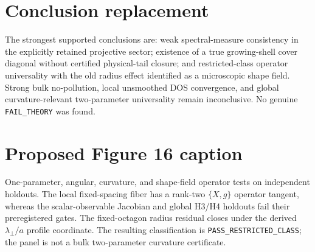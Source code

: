 \documentclass[11pt]{article}
\begin{document}
\section*{Conclusion replacement}
The strongest supported conclusions are: weak spectral-measure consistency in
the explicitly retained projective sector; existence of a true growing-shell
cover diagonal without certified physical-tail closure; and restricted-class
operator universality with the old radius effect identified as a microscopic
shape field.  Strong bulk no-pollution, local unsmoothed DOS convergence, and
global curvature-relevant two-parameter universality remain inconclusive.  No
genuine \texttt{FAIL\_THEORY} was found.

\section*{Proposed Figure 16 caption}
One-parameter, angular, curvature, and shape-field operator tests on independent
holdouts.  The local fixed-spacing fiber has a rank-two $\{X,g\}$ operator
tangent, whereas the scalar-observable Jacobian and global H3/H4 holdouts fail
their preregistered gates.  The fixed-octagon radius residual closes under the
derived $\lambda_\perp/a$ profile coordinate.  The resulting classification is
\texttt{PASS\_RESTRICTED\_CLASS}; the panel is not a bulk two-parameter
curvature certificate.
\end{document}
